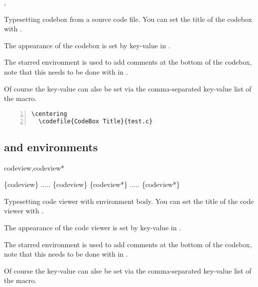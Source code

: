\documentclass{ctxdoc-en}
\begin{document}
\begin{function}[added=2021-12-25,updated=2021-12-25]{\codefile,\codefile*}
  \begin{syntax}
        
       
  \end{syntax}
  Typesetting codebox from a source code file.
  You can set the title of the codebox with .

  The appearance of the codebox is set by key-value in .

  The starred environment  is used to add comments at the bottom of the codebox,
  note that this needs to be done with  in .

  Of course the key-value  can alse be set
  via the comma-separated key-value list of the  macro.
\end{function}
\newpage
\begin{Verbatim}[frame=none,numbers=left,gobble=2]
  \centering
  \codefile{CodeBox Title}{test.c}
\end{Verbatim}

\begin{center}
  \begin{minipage}{0.85\textwidth}
  \end{minipage}
\end{center}

\subsection{ and  environments}

\begin{function}[added=2021-12-26,updated=2021-12-26]{codeview,codeview*}
  \begin{syntax}
    \{codeview\}
    .....
    \{codeview\}
    \{codeview*\}
    .....
    \{codeview*\}
  \end{syntax}
  Typesetting code viewer with environment body.
  You can set the title of the code viewer with .

  The appearance of the code viewer is set by key-value in .

  The starred environment  is used to add comments at the bottom of the codebox,
  note that this needs to be done with  in .

  Of course the key-value  can alse be set
  via the comma-separated key-value list of the  macro.
\end{function}
\end{document}
